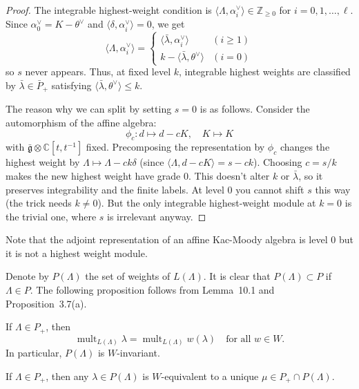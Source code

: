 \documentclass[12pt]{article}
\begin{document}
\begin{proof}
    The integrable highest-weight condition is
    $\langle \Lambda,\alpha_i^\vee\rangle\in\mathbb{Z}_{\ge 0}$ for $i=0,1,\dots,\ell$.
    Since $\alpha_0^\vee=K-\theta^\vee$ and $\langle \delta,\alpha_i^\vee\rangle=0$, we get
    \[
        \langle \Lambda,\alpha_i^\vee\rangle=
        \begin{cases}
            \langle \bar\lambda,\alpha_i^\vee\rangle & (i\ge1) \\
            k-\langle \bar\lambda,\theta^\vee\rangle & (i=0)
        \end{cases}
    \]
    so $s$ never appears. Thus, at fixed level $k$, integrable highest weights are classified by
    $\bar\lambda\in \bar P_+$ satisfying $\langle \bar\lambda,\theta^\vee\rangle\le k$.

    The reason why we can split by setting $s=0$ is as follows. Consider the automorphism of the affine algebra:
    \[\phi_c: d\mapsto d - cK, \quad K\mapsto K\]
    with $\bar{\mathfrak g}\otimes\mathbb{C}[t,t^{-1}]$ fixed. Precomposing the representation by $\phi_c$ changes the highest weight by $\Lambda \mapsto \Lambda - ck\delta$ (since $\langle\Lambda, d-cK\rangle = s - ck$). Choosing $c = s/k$ makes the new highest weight have grade 0. This doesn't alter $k$ or $\bar\lambda$, so it preserves integrability and the finite labels. At level 0 you cannot shift $s$ this way (the trick needs $k\neq0$). But the only integrable highest-weight module at $k=0$ is the trivial one, where $s$ is irrelevant anyway.
\end{proof}
Note that the adjoint representation of an affine Kac-Moody algebra is level $0$ but it is not a highest weight module.


Denote by $P(\Lambda)$ the set of weights of $L(\Lambda)$. It is clear that
$P(\Lambda) \subset P$ if $\Lambda \in P$.
The following proposition follows from Lemma~10.1 and Proposition~3.7(a).

\begin{proposition}[10.1]
    If $\Lambda \in P_+$, then
    \[
        \operatorname{mult}_{L(\Lambda)} \lambda
        = \operatorname{mult}_{L(\Lambda)} w(\lambda)
        \quad \text{for all } w \in W.
    \]
    In particular, $P(\Lambda)$ is $W$-invariant.
\end{proposition}

\begin{corollary}[10.1]
    If $\Lambda \in P_+$, then any $\lambda \in P(\Lambda)$
    is $W$-equivalent to a unique
    $\mu \in P_+ \cap P(\Lambda)$.
\end{corollary}
\end{document}
